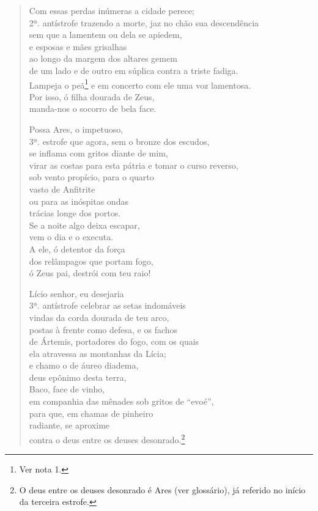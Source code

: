 \begin{verse}
Com essas perdas inúmeras a cidade perece;\\ 2ª. antístrofe
trazendo a morte, jaz no chão sua descendência \\
sem que a lamentem ou dela se apiedem,\\
e esposas e mães grisalhas\\
ao longo da margem dos altares gemem\\
de um lado e de outro em súplica contra a triste fadiga.\\
Lampeja o peã\footnote{Ver nota 1.} e em concerto com ele uma voz lamentosa.\\
Por isso, ó filha dourada de Zeus,\\
manda-nos o socorro de bela face.

Possa Ares, o impetuoso,\\ 3ª. estrofe 
que agora, sem o bronze dos escudos,\\
se inflama com gritos diante de mim,\\
virar as costas para esta pátria e tomar o curso reverso,\\
sob vento propício, para o quarto\\
vasto de Anfitrite\\
ou para as inóspitas ondas\\
trácias longe dos portos.\\
Se a noite algo deixa escapar,\\
vem o dia e o executa.\\
A ele, ó detentor da força \\
dos relâmpagos que portam fogo,\\
ó Zeus pai, destrói com teu raio!

Lício senhor, eu desejaria\\ 3ª. antístrofe
celebrar as setas indomáveis\\
vindas da corda dourada de teu arco,\\
postas à frente como defesa, e os fachos\\
de Ártemis, portadores do fogo, com os quais\\
ela atravessa as montanhas da Lícia;\\
e chamo o de áureo diadema,\\
deus epônimo desta terra, \\
Baco, face de vinho,\\
em companhia das mênades sob gritos de ``evoé'',\\
para que, em chamas de pinheiro\\
radiante, se aproxime\\
contra o deus entre os deuses desonrado.\footnote{O deus entre os deuses desonrado é Ares (ver glossário), já referido no início da terceira estrofe.}
\end{verse}

